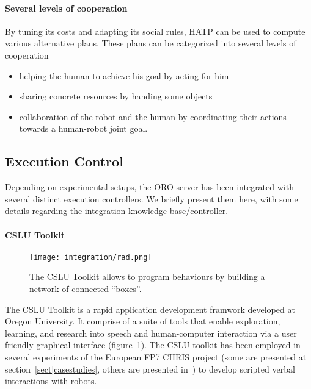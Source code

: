 \paragraph{Several levels of cooperation} By tuning its costs and adapting its
social rules, HATP can be used to compute various alternative plans. These
plans can be categorized into several levels of cooperation

\begin{itemize}

    \item helping the human to achieve his goal by acting for him

    \item sharing concrete resources by handing some objects

    \item collaboration of the robot and the human by coordinating their
    actions towards a human-robot joint goal.

\end{itemize}


\subsection{Execution Control}

Depending on experimental setups, the ORO server has been integrated with
several distinct execution controllers. We briefly present them here, with some
details regarding the integration knowledge base/controller.

\paragraph{CSLU Toolkit}
\label{sect|rad}

\begin{figure}
    \centering
    \texttt{[image: integration/rad.png]}

    \caption{The CSLU Toolkit allows to program behaviours by building a
    network of connected ``boxes''.}

    \label{fig|rad}
\end{figure}
The CSLU Toolkit is a rapid application development framwork developed at
Oregon University. It comprise of a suite of tools that enable exploration,
learning, and research into speech and human-computer interaction via a user
friendly graphical interface (figure~\ref{fig|rad}). The CSLU toolkit has been
employed in several experiments of the European FP7 CHRIS project (some are
presented at section~\ref{sect|casestudies}, others are presented
in~\cite{Lallee2010, Lallee2011}) to develop scripted verbal interactions with
robots.

